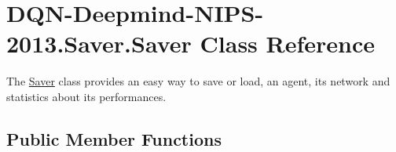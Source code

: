 \hypertarget{classDQN-Deepmind-NIPS-2013_1_1Saver_1_1Saver}{}\section{D\+Q\+N-\/\+Deepmind-\/\+N\+I\+P\+S-\/2013.Saver.\+Saver Class Reference}
\label{classDQN-Deepmind-NIPS-2013_1_1Saver_1_1Saver}


The \hyperlink{classDQN-Deepmind-NIPS-2013_1_1Saver_1_1Saver}{Saver} class provides an easy way to save or load, an agent, its network and statistics about its performances.  


\subsection*{Public Member Functions}
